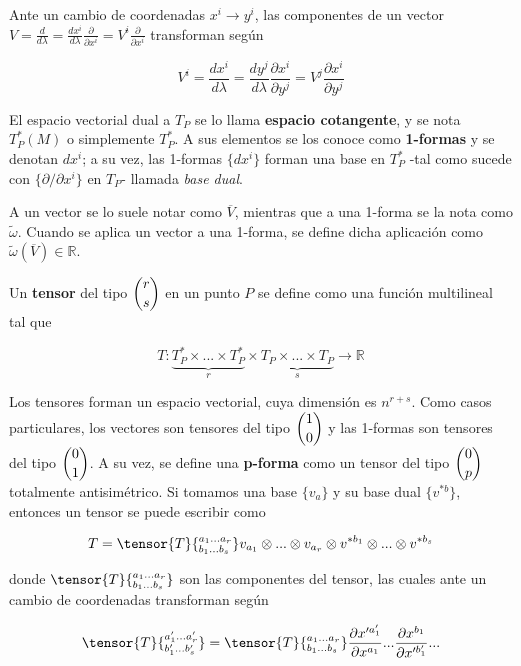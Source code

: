 Ante un cambio de coordenadas $x^i\rightarrow y^i$, las componentes de un vector $V=\frac{d}{d\lambda}=\frac{dx^i}{d\lambda}\frac{\partial}{\partial x^i}=V^i\frac{\partial}{\partial x^i}$ transforman según 

\begin{equation*}
    V^i=\frac{dx^i}{d\lambda}=\frac{dy^j}{d\lambda}\frac{\partial x^i}{\partial y^j}=V^j\frac{\partial x^i}{\partial y^j}
\end{equation*}

El espacio vectorial dual a $T_P$ se lo llama \textbf{espacio cotangente}, y se nota $T^*_P(M)$ o simplemente  $T^*_P$. A sus elementos se los conoce como \textbf{1-formas} y se denotan $dx^i$; a su vez, las 1-formas $\{dx^i\}$ forman una base en $T^*_P$ -tal como sucede con $\{\partial/\partial x^i\}$ en $T_P$- llamada \textit{base dual}.

A un vector se lo suele notar como $\overline{V}$, mientras que a una 1-forma se la nota como $\widetilde{\omega}$. Cuando se aplica un vector a una 1-forma, se define dicha aplicación como $\widetilde{\omega}(\overline{V})\in \mathbb{R}$.

Un \textbf{tensor} del tipo $\dbinom{r}{s}$ en un punto $P$ se define como una función multilineal tal que

\begin{equation*}
T:\underbrace{T^*_P\times ...\times T^*_P}_{r}\times \underbrace{T_P \times ...\times T_P}_{s}\rightarrow\mathbb{R}
\end{equation*}

Los tensores forman un espacio vectorial, cuya dimensión es $n^{r+s}$. Como casos particulares, los vectores son tensores del tipo $\dbinom{1}{0}$ y las 1-formas son tensores del tipo $\dbinom{0}{1}$. A su vez, se define una \textbf{p-forma} como un tensor del tipo $\dbinom{0}{p}$ totalmente antisimétrico. Si tomamos una base $\{v_a\}$ y su base dual $\{v^{*b}\}$, entonces un tensor se puede escribir como

\begin{equation*}
    T=\tensor{T}{^{a_1...a_r}_{b_1...b_s}} v_{a_1}\otimes...\otimes v_{a_r}\otimes v^{*b_1}\otimes...\otimes v^{*b_s}
\end{equation*}

donde $\tensor{T}{^{a_1...a_r}_{b_1...b_s}}$ son las componentes del tensor, las cuales ante un cambio de coordenadas transforman según

\begin{equation*}
    \tensor{T}{^{a'_1...a'_r}_{b'_1...b'_s}}=\tensor{T}{^{a_1...a_r}_{b_1...b_s}}\frac{\partial x'^{a'_1}}{\partial x^{a_1}}...\frac{\partial x^{b_1}}{\partial x'^{b'_1}}...
\end{equation*}


